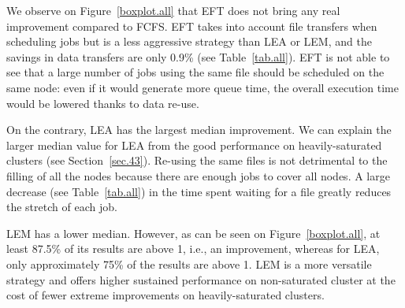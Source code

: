 \documentclass[conference]{IEEEtran}
\begin{document}
We observe on Figure~\ref{boxplot.all} that EFT does not bring any real improvement compared to FCFS.
EFT takes into account file transfers when scheduling jobs but is a less aggressive strategy than LEA or LEM, and the savings in data transfers are only 0.9\% (see Table~\ref{tab.all}).
EFT is not able to see that a large number of jobs using the same file
should be scheduled on the same node: even if it would generate more
queue time, the overall execution time would be lowered thanks to data re-use.

\begin{table}
\end{table}

On the contrary, LEA has the largest median improvement.
We can explain the larger median value for LEA from the good performance on heavily-saturated clusters (see Section~\ref{sec.43}).
Re-using the same files is not detrimental to the filling of all the nodes because there are enough jobs to cover all nodes.
A large decrease (see Table~\ref{tab.all}) in the time spent waiting for a file greatly reduces the stretch of each job.

LEM has a lower median.
However, as can be seen on Figure~\ref{boxplot.all}, at least 87.5\% of its results are above 1, i.e., an improvement, whereas for LEA, only approximately 75\% of the results are above 1. 
LEM is a more versatile strategy and offers higher sustained performance on non-saturated cluster at the cost
of fewer extreme improvements on heavily-saturated clusters.

\begin{table}
\end{table}
\end{document}
